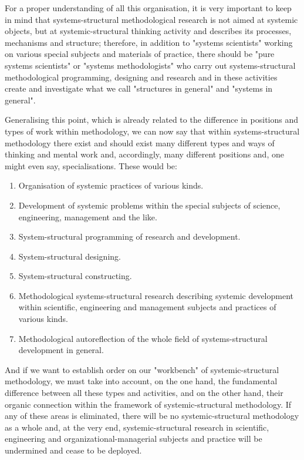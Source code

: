 \documentclass[11pt,a4paper]{article}
\begin{document}
For a proper understanding of all this organisation, it is very important to
keep in mind that systems-structural methodological research is not aimed at
systemic objects, but at systemic-structural thinking activity and describes
its processes, mechanisms and structure; therefore, in addition to "systems
scientists" working on various special subjects and materials of practice,
there should be "pure systems scientists" or "systems methodologists" who
carry out systems-structural methodological programming, designing and
research and in these activities create and investigate what we call
"structures in general" and "systems in general".

Generalising this point, which is already related to the difference in
positions and types of work within methodology, we can now say that within
systems-structural methodology there exist and should exist many different
types and ways of thinking and mental work and, accordingly, many different
positions and, one might even say, specialisations. These would be:
\begin{enumerate}[noitemsep]
\item Organisation of systemic practices of various kinds. 
\item Development of systemic problems within the special subjects of science,
  engineering, management and the like.
\item System-structural programming of research and development.
\item System-structural designing.
\item System-structural constructing.
\item Methodological systems-structural research describing systemic
  development within scientific, engineering and management subjects and
  practices of various kinds.
\item Methodological autoreflection of the whole field of systems-structural
  development in general.
\end{enumerate}

And if we want to establish order on our "workbench" of systemic-structural
methodology, we must take into account, on the one hand, the fundamental
difference between all these types and activities, and on the other hand,
their organic connection within the framework of systemic-structural
methodology. If any of these areas is eliminated, there will be no
systemic-structural methodology as a whole and, at the very end,
systemic-structural research in scientific, engineering and
organizational-managerial subjects and practice will be undermined and cease
to be deployed.
\end{document}
